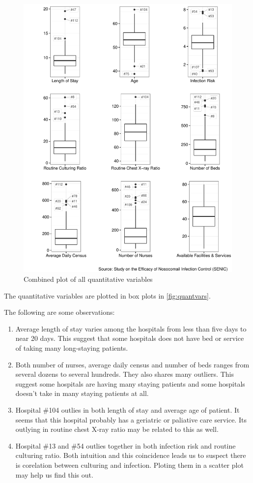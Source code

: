 \documentclass[11pt]{article}
\begin{document}
\begin{figure}[H]
  \centering
  \includegraphics[scale=0.8]{quantitative_vars.pdf}
  \caption{Combined plot of all quantitative variables}\label{fig:quantvars}
\end{figure}

The quantitative variables are plotted in box plots in \autoref{fig:quantvars}.

The following are some observations:
\begin{enumerate}
\item
  Average length of stay varies among the hospitals from less than five days to
  near 20 days. This suggest that some hospitals does not have bed or service of
  taking many long-staying patients.
\item
  Both number of nurses, average daily census and number of beds ranges from
  several dozens to several hundreds. They also shares many outliers. This suggest
  some hospitals are having many staying patients and some hospitals doesn't take
  in many staying patients at all.
\item
  Hospital \#104 outlies in both length of stay and average age of patient. It
  seems that this hospital probably has a geriatric or paliative care service.
  Its outlying in routine chest X-ray ratio may be related to this as well.
\item
  Hospital \#13 and \#54 outlies together in both infection risk and routine culturing
  ratio. Both intuition and this coincidence leads us to suspect there is corelation
  between culturing and infection. Ploting them in a scatter plot may help us find
  this out.
\end{enumerate}
\end{document}
